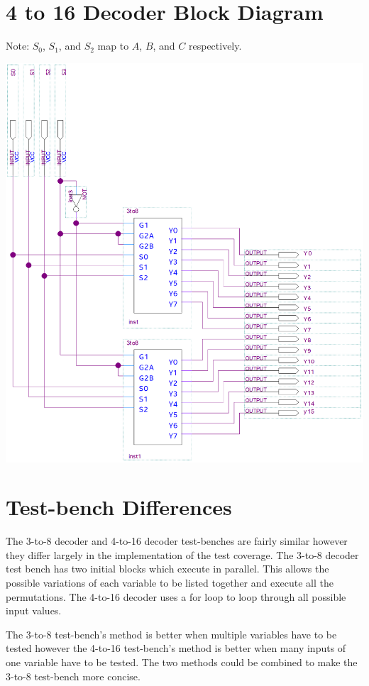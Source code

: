 \documentclass[12pt,letterpaper,titlepage]{article}
\begin{document}
\begin{raggedright}
\clearpage
\section{4 to 16 Decoder Block Diagram}

Note: $S_0$, $S_1$, and $S_2$ map to $A$, $B$, and $C$ respectively.
\begin{center}
\includegraphics[width=\textwidth, height=0.6\textheight, keepaspectratio=true]{4to16}
\end{center}

\section{Test-bench Differences}

The 3-to-8 decoder and 4-to-16 decoder test-benches are fairly similar however they differ largely in the implementation of the test coverage. The 3-to-8 decoder test bench has two initial blocks which execute in parallel. This allows the possible variations of each variable to be listed together and execute all the permutations. The 4-to-16 decoder uses a for loop to loop through all possible input values.

The 3-to-8 test-bench's method is better when multiple variables have to be tested however the 4-to-16 test-bench's method is better when many inputs of one variable have to be tested. The two methods could be combined to make the 3-to-8 test-bench more concise.


\end{raggedright}
\end{document}
